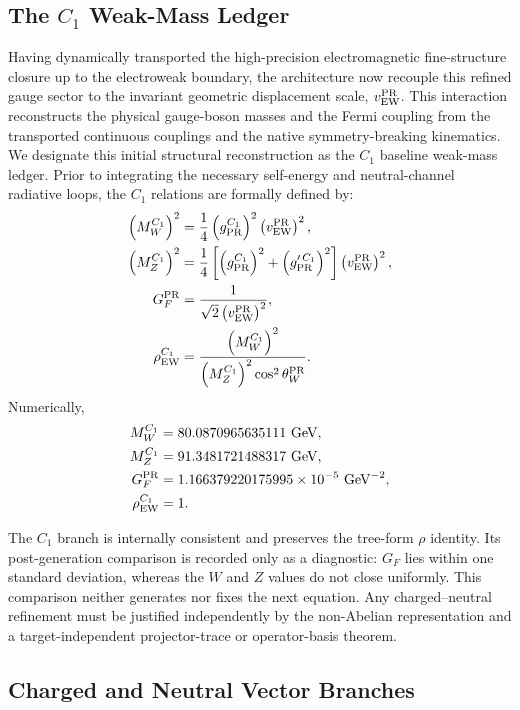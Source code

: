 \documentclass[11pt]{article}
\begin{document}
\subsection{The \(C_1\) Weak-Mass Ledger}
\label{subsec:priii-ew-C1-ledger}

Having dynamically transported the high-precision electromagnetic fine-structure closure up to the electroweak boundary, the architecture now recouple this refined gauge sector to the invariant geometric displacement scale, $v_{\rm EW}^{\rm PR}$. This interaction reconstructs the physical gauge-boson masses and the Fermi coupling from the transported continuous couplings and the native symmetry-breaking kinematics. We designate this initial structural reconstruction as the $C_1$ baseline weak-mass ledger. Prior to integrating the necessary self-energy and neutral-channel radiative loops, the $C_1$ relations are formally defined by:
\begin{align}
\left(M_W^{C_1}\right)^2
&=
\frac14\left(g_{\rm PR}^{C_1}\right)^2
\left(v_{\rm EW}^{\rm PR}\right)^2,
\\
\left(M_Z^{C_1}\right)^2
&=
\frac14\left[
\left(g_{\rm PR}^{C_1}\right)^2
+
\left(g_{\rm PR}^{\prime\,C_1}\right)^2
\right]
\left(v_{\rm EW}^{\rm PR}\right)^2,
\\
G_F^{\rm PR}
&=
\frac{1}{\sqrt{2}\left(v_{\rm EW}^{\rm PR}\right)^2},
\\
\rho_{\rm EW}^{C_1}
&=
\frac{\left(M_W^{C_1}\right)^2}
{\left(M_Z^{C_1}\right)^2\cos^2\theta_W^{\rm PR}} .
\end{align}
Numerically,
\begin{align}
M_W^{C_1}
&=
80.0870965635111\ {\rm GeV},
\\
M_Z^{C_1}
&=
91.3481721488317\ {\rm GeV},
\\
G_F^{\rm PR}
&=
1.166379220175995\times10^{-5}\ {\rm GeV}^{-2},
\\
\rho_{\rm EW}^{C_1}
&=
1 .
\end{align}

The \(C_1\) branch is internally consistent and preserves the tree-form \(\rho\) identity.  Its post-generation comparison is recorded only as a diagnostic: \(G_F\) lies within one standard deviation, whereas the \(W\) and \(Z\) values do not close uniformly.  This comparison neither generates nor fixes the next equation.  Any charged--neutral refinement must be justified independently by the non-Abelian representation and a target-independent projector-trace or operator-basis theorem.

\subsection{Charged and Neutral Vector Branches}
\label{subsec:priii-ew-angle-only-obstruction}
\end{document}
